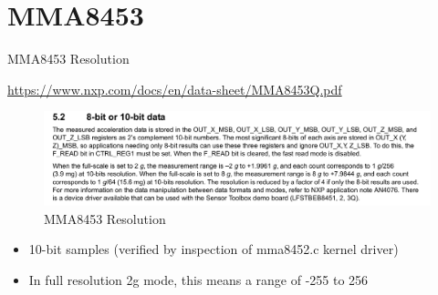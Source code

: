 \section{MMA8453}

\begin{frame}
	{MMA8453 Resolution}

	\url{https://www.nxp.com/docs/en/data-sheet/MMA8453Q.pdf}
	     \begin{figure}[H]
		     \includegraphics[width=5in]{IMAGES/mma8453-resolution}
				       \caption{MMA8453 Resolution}
	     \end{figure}
	     \begin{itemize}
		     \item
			     10-bit samples (verified by inspection of mma8452.c kernel driver)
		     \item
			     In full resolution 2g mode, this means a range of -255 to 256
	\end{itemize}
\end{frame}
